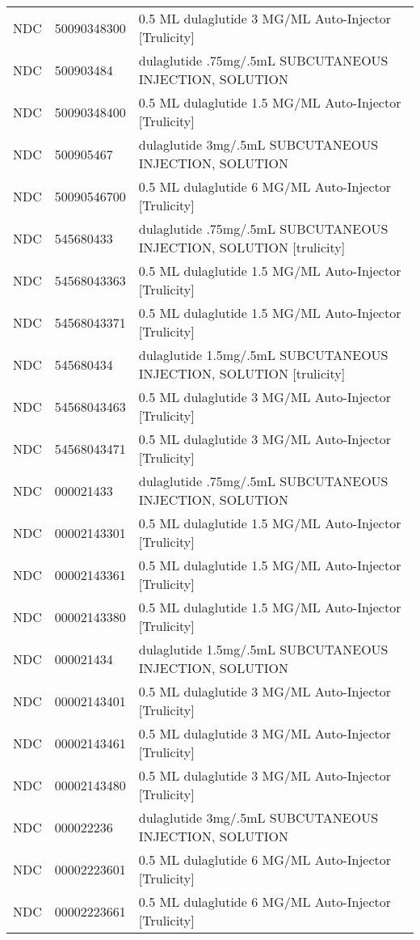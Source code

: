 \begin{longtable}{p{}p{}p{}}
  NDC & 50090348300 & 0.5 ML dulaglutide 3 MG/ML Auto-Injector [Trulicity] \\ 
  NDC & 500903484 & dulaglutide .75mg/.5mL SUBCUTANEOUS INJECTION, SOLUTION \\ 
  NDC & 50090348400 & 0.5 ML dulaglutide 1.5 MG/ML Auto-Injector [Trulicity] \\ 
  NDC & 500905467 & dulaglutide 3mg/.5mL SUBCUTANEOUS INJECTION, SOLUTION \\ 
  NDC & 50090546700 & 0.5 ML dulaglutide 6 MG/ML Auto-Injector [Trulicity] \\ 
  NDC & 545680433 & dulaglutide .75mg/.5mL SUBCUTANEOUS INJECTION, SOLUTION [trulicity] \\ 
  NDC & 54568043363 & 0.5 ML dulaglutide 1.5 MG/ML Auto-Injector [Trulicity] \\ 
  NDC & 54568043371 & 0.5 ML dulaglutide 1.5 MG/ML Auto-Injector [Trulicity] \\ 
  NDC & 545680434 & dulaglutide 1.5mg/.5mL SUBCUTANEOUS INJECTION, SOLUTION [trulicity] \\ 
  NDC & 54568043463 & 0.5 ML dulaglutide 3 MG/ML Auto-Injector [Trulicity] \\ 
  NDC & 54568043471 & 0.5 ML dulaglutide 3 MG/ML Auto-Injector [Trulicity] \\ 
  NDC & 000021433 & dulaglutide .75mg/.5mL SUBCUTANEOUS INJECTION, SOLUTION \\ 
  NDC & 00002143301 & 0.5 ML dulaglutide 1.5 MG/ML Auto-Injector [Trulicity] \\ 
  NDC & 00002143361 & 0.5 ML dulaglutide 1.5 MG/ML Auto-Injector [Trulicity] \\ 
  NDC & 00002143380 & 0.5 ML dulaglutide 1.5 MG/ML Auto-Injector [Trulicity] \\ 
  NDC & 000021434 & dulaglutide 1.5mg/.5mL SUBCUTANEOUS INJECTION, SOLUTION \\ 
  NDC & 00002143401 & 0.5 ML dulaglutide 3 MG/ML Auto-Injector [Trulicity] \\ 
  NDC & 00002143461 & 0.5 ML dulaglutide 3 MG/ML Auto-Injector [Trulicity] \\ 
  NDC & 00002143480 & 0.5 ML dulaglutide 3 MG/ML Auto-Injector [Trulicity] \\ 
  NDC & 000022236 & dulaglutide 3mg/.5mL SUBCUTANEOUS INJECTION, SOLUTION \\ 
  NDC & 00002223601 & 0.5 ML dulaglutide 6 MG/ML Auto-Injector [Trulicity] \\ 
  NDC & 00002223661 & 0.5 ML dulaglutide 6 MG/ML Auto-Injector [Trulicity] \\ 

\end{longtable}
